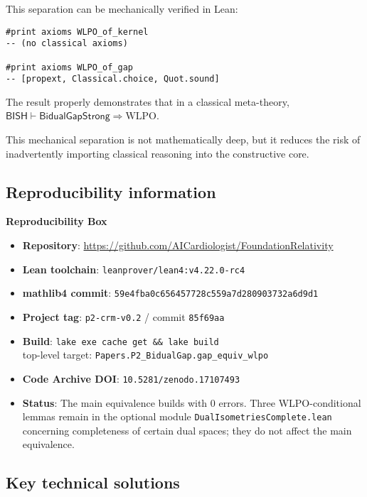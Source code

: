 \documentclass[11pt]{article}
\newcommand{\leanRepo}{\url{https://github.com/AICardiologist/FoundationRelativity}}
\newcommand{\WLPO}{\mathrm{WLPO}}
\begin{document}
This separation can be mechanically verified in Lean:
\begin{lstlisting}[language=Lean,numbers=none]
#print axioms WLPO_of_kernel
-- (no classical axioms)

#print axioms WLPO_of_gap  
-- [propext, Classical.choice, Quot.sound]
\end{lstlisting}

The result properly demonstrates that in a classical meta-theory, 
$\textsf{BISH} \vdash \textsf{BidualGapStrong} \Rightarrow \WLPO$.

This mechanical separation is not mathematically deep, but it reduces the risk of inadvertently importing classical reasoning into the constructive core.

\subsection{Reproducibility information}

\begin{mdframed}[backgroundcolor=gray!10]
\textbf{Reproducibility Box}
\begin{itemize}
\item \textbf{Repository}: \leanRepo
\item \textbf{Lean toolchain}: \texttt{leanprover/lean4:v4.22.0-rc4}
\item \textbf{mathlib4 commit}: \texttt{59e4fba0c656457728c559a7d280903732a6d9d1}
\item \textbf{Project tag}: \texttt{p2-crm-v0.2} / commit \texttt{85f69aa}
\item \textbf{Build}: \texttt{lake exe cache get \&\& lake build} \\
      top-level target: \texttt{Papers.P2\_BidualGap.gap\_equiv\_wlpo}
\item \textbf{Code Archive DOI}: \texttt{10.5281/zenodo.17107493}
\item \textbf{Status}: The main equivalence builds with 0 errors. Three WLPO-conditional lemmas remain in the optional module \texttt{DualIsometriesComplete.lean} concerning completeness of certain dual spaces; they do not affect the main equivalence.
\end{itemize}
\end{mdframed}

\subsection{Key technical solutions}
\end{document}
